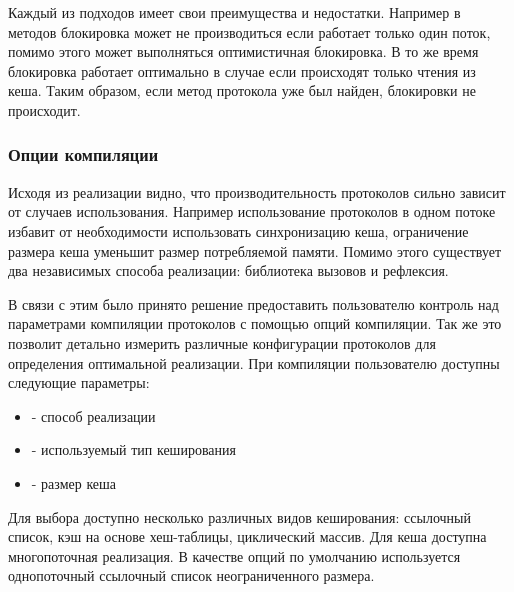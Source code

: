 Каждый из подходов имеет свои преимущества и недостатки. Например в  методов блокировка может не производиться если работает только один поток, помимо этого может выполняться оптимистичная блокировка\cite{jvm:optimistic_lock}. В то же время  блокировка работает оптимально в случае если происходят только чтения из кеша. Таким образом, если метод протокола уже был найден, блокировки не происходит.

\subsubsection{Опции компиляции}

Исходя из реализации видно, что производительность протоколов сильно зависит от случаев использования. Например использование протоколов в одном потоке избавит от необходимости использовать синхронизацию кеша, ограничение размера кеша уменьшит размер потребляемой памяти. Помимо этого существует два независимых способа реализации: библиотека вызовов и рефлексия.

В связи с этим было принято решение предоставить пользователю контроль над параметрами компиляции протоколов с помощью опций компиляции. Так же это позволит детально измерить различные конфигурации протоколов для определения оптимальной реализации. При компиляции пользователю доступны следующие параметры:
\begin{itemize}
  \item {} - способ реализации
  \item {} - используемый тип кеширования
  \item {} - размер кеша
\end{itemize}

Для выбора доступно несколько различных видов кеширования: ссылочный список,  кэш\cite{LRUCache} на основе хеш-таблицы, циклический массив. Для кеша доступна многопоточная реализация. В качестве опций по умолчанию используется однопоточный ссылочный список неограниченного размера.

